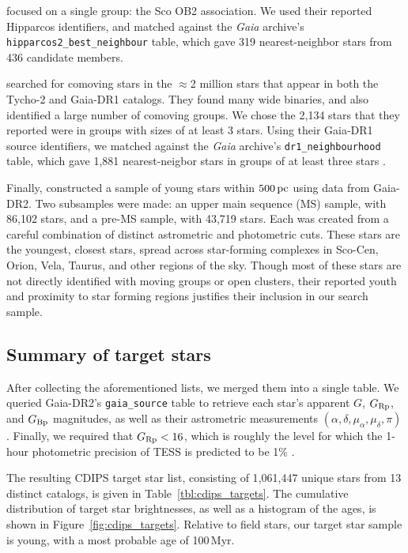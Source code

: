 \documentclass[12pt,twocolumn,tighten,trackchanges]{aastex62}
\begin{document}
\citet{rizzuto_multidimensional_2011} focused on a single group: the
Sco OB2 association. We used their reported Hipparcos identifiers, and
matched against the {\it Gaia} archive's
\texttt{hipparcos2\_best\_neighbour} table, which gave 319
nearest-neighbor stars from 436 candidate members.

\citet{oh_comoving_2017} searched for comoving stars in the $\approx$2
million stars that appear in both the Tycho-2 and Gaia-DR1
catalogs.  They found many wide binaries, and also identified a large
number of comoving groups.  We chose the 2{,}134 stars that they
reported were in groups with sizes of at least 3 stars.  Using their
Gaia-DR1 source identifiers, we matched against the {\it Gaia}
archive's \texttt{dr1\_neighbourhood} table, which gave 1{,}881
nearest-neigbor stars in groups of at least three stars
\citep{marrese_gaia_2019}.

Finally, \citet{zari_3d_2018} constructed a sample of young stars
within $500\,{\rm pc}$ using data from Gaia-DR2. Two subsamples were
made: an upper main sequence (MS) sample, with 86{,}102 stars, and
a pre-MS sample, with 43{,}719 stars.  Each was created from a
careful combination of distinct astrometric and photometric cuts.
These stars are the youngest, closest stars, spread across
star-forming complexes in Sco-Cen, Orion, Vela, Taurus, and other
regions of the sky.  Though most of these stars are not directly
identified with moving groups or open clusters, their reported youth
and proximity to star forming regions justifies their inclusion in our
search sample.



\subsection{Summary of target stars}
\label{subsec:ocmgsummary}


After collecting the aforementioned lists, we merged them into a
single table. We queried Gaia-DR2's \texttt{gaia\_source} table to
retrieve each star's apparent $G$, $G_{\rm Rp}$, and $G_{\rm Bp}$
magnitudes, as well as their astrometric measurements $(\alpha,
\delta, \mu_\alpha, \mu_\delta, \pi)$.  Finally, we required that
$G_{\rm Rp} < 16$, which is roughly the level for which the 1-hour
photometric precision of TESS is predicted to be 1\%
\citep{ricker_transiting_2015}.

The resulting CDIPS target star list, consisting of 1{,}061{,}447
unique stars from 13 distinct catalogs, is given in
Table~\ref{tbl:cdips_targets}.  The cumulative distribution of target
star brightnesses, as well as a histogram of the ages, is shown in
Figure~\ref{fig:cdips_targets}.  Relative to field stars, our target
star sample is young, with a most probable age of 100$\,$Myr.
\end{document}
